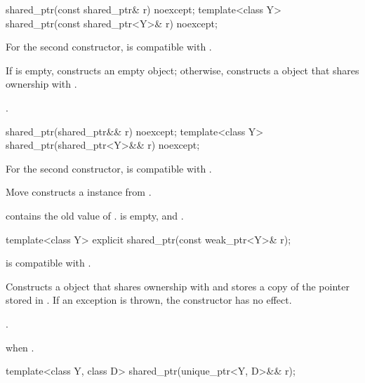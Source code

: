%
\begin{itemdecl}
shared_ptr(const shared_ptr& r) noexcept;
template<class Y> shared_ptr(const shared_ptr<Y>& r) noexcept;
\end{itemdecl}

\begin{itemdescr}
\pnum
\constraints
For the second constructor,  is compatible with .

\pnum
\effects
If  is empty, constructs
an empty  object; otherwise, constructs
a  object that shares ownership with .

\pnum
\ensures
{}.
\end{itemdescr}

%
\begin{itemdecl}
shared_ptr(shared_ptr&& r) noexcept;
template<class Y> shared_ptr(shared_ptr<Y>&& r) noexcept;
\end{itemdecl}

\begin{itemdescr}
\pnum
\constraints
For the second constructor,  is compatible with .

\pnum
\effects
Move constructs a  instance from .

\pnum
\ensures
{} contains the old value of
.  is empty, and .
\end{itemdescr}

%
%
\begin{itemdecl}
template<class Y> explicit shared_ptr(const weak_ptr<Y>& r);
\end{itemdecl}

\begin{itemdescr}
\pnum
\constraints
{} is compatible with .

\pnum
\effects
Constructs a  object that shares ownership with
 and stores a copy of the pointer stored in .
If an exception is thrown, the constructor has no effect.

\pnum
\ensures
{}.

\pnum
\throws
{} when .
\end{itemdescr}

%
%
\begin{itemdecl}
template<class Y, class D> shared_ptr(unique_ptr<Y, D>&& r);
\end{itemdecl}


